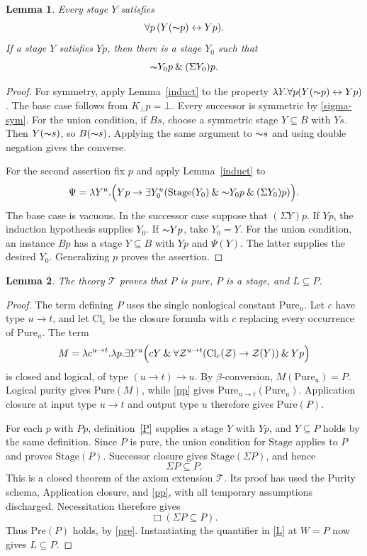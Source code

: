 \documentclass[12pt,leqno]{article}
\newcommand{\AND}{\ensuremath{\mathbin{\&}}}
\newcommand{\IFF}{\ensuremath{\leftrightarrow}}
\newcommand{\IC}{\ensuremath{\rightarrow}}
\newcommand{\NOT}{\ensuremath{\text{$\thicksim$}}}
\newcommand{\Pure}{\mathrm{Pure}}
\newcommand{\Stage}{\mathrm{Stage}}
\newcommand{\Pre}{\mathrm{Pre}}
\newcommand{\Clos}{\mathrm{Cl}}
\newcommand{\Th}{\mathcal T}
\newcommand{\cZ}{\mathcal Z}
\newcommand{\Kbot}{K_{\bot}}
\newtheorem{lemma}{Lemma}
\begin{document}
\begin{lemma}\label{stage-properties}
Every stage $Y$ satisfies
\begin{equation}
 \forall p\,(Y(\NOT p)\IFF Yp).
 \label{stage-sym}
\end{equation}
If a stage $Y$ satisfies $Yp$, then there is a stage $Y_0$ such that
\begin{equation}
 \NOT Y_0p\AND(\Sigma Y_0)p.
 \label{predecessor}
\end{equation}
\end{lemma}
\begin{proof}
For symmetry, apply Lemma~\ref{induct} to the property
$\lambda Y.\forall p(Y(\NOT p)\IFF Yp)$. The base case follows
from $\Kbot p=\bot$. Every successor is symmetric by
\eqref{sigma-sym}. For the union condition, if $Bs$, choose a
symmetric stage $Y\subseteq B$ with $Ys$. Then $Y(\NOT s)$,
so $B(\NOT s)$. Applying the same argument to $\NOT s$ and using
double negation gives the converse.

For the second assertion fix $p$ and apply Lemma~\ref{induct} to
\[
 \Psi=\lambda Y^u.\Bigl(Yp\IC\exists Y_0^u
       (\Stage(Y_0)\AND\NOT Y_0p\AND(\Sigma Y_0)p)\Bigr).
\]
The base case is vacuous. In the successor case suppose that
$(\Sigma Y)p$. If $Yp$, the induction hypothesis supplies $Y_0$.
If $\NOT Yp$, take $Y_0=Y$. For the union condition, an instance
$Bp$ has a stage $Y\subseteq B$ with $Yp$ and $\Psi(Y)$.
The latter supplies the desired $Y_0$. Generalizing $p$ proves
the assertion.
\end{proof}

\begin{lemma}\label{bridge}
The theory $\Th$ proves that $P$ is pure, $P$ is a stage, and
$L\subseteq P$.
\end{lemma}
\begin{proof}
The term defining $P$ uses the single nonlogical constant $\Pure_u$.
Let $c$ have type $u\to t$, and let $\Clos_c$ be the closure formula
with $c$ replacing every occurrence of $\Pure_u$. The term
\[
 M=\lambda c^{u\to t}.\lambda p.
    \exists Y^u\Bigl(cY\AND
       \forall\cZ^{u\to t}(\Clos_c(\cZ)\IC\cZ(Y))\AND Yp\Bigr)
\]
is closed and logical, of type $(u\to t)\to u$.
By $\beta$-conversion, $M(\Pure_u)=P$.
Logical purity gives $\Pure(M)$, while \eqref{pp} gives
$\Pure_{u\to t}(\Pure_u)$. Application closure at input type
$u\to t$ and output type $u$ therefore gives $\Pure(P)$.

For each $p$ with $Pp$, definition~\eqref{P} supplies a stage $Y$
with $Yp$, and $Y\subseteq P$ holds by the same definition.
Since $P$ is pure, the union condition for $\Stage$ applies to $P$
and proves $\Stage(P)$. Successor closure gives $\Stage(\Sigma P)$,
and hence
\begin{equation}
 \Sigma P\subseteq P.
 \label{P-pre}
\end{equation}
This is a closed theorem of the axiom extension $\Th$. Its proof has
used the Purity schema, Application closure, and \eqref{pp}, with all
temporary assumptions discharged. Necessitation therefore gives
\[
 \Box(\Sigma P\subseteq P).
\]
Thus $\Pre(P)$ holds, by \eqref{pre}.
Instantiating the quantifier in \eqref{L} at $W=P$ now gives
$L\subseteq P$.
\end{proof}
\end{document}
